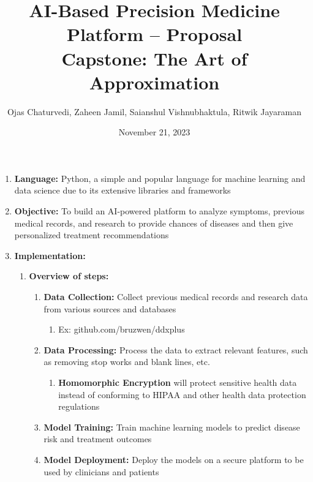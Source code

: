 \documentclass{article}
\title{AI-Based Precision Medicine Platform -- Proposal \\ \large Capstone: The Art of Approximation}
\author{Ojas Chaturvedi, Zaheen Jamil, Saianshul Vishnubhaktula, Ritwik Jayaraman}
\date{November 21, 2023}
\begin{document}
\maketitle


\begin{enumerate}
    \item \textbf{Language:} Python, a simple and popular language for machine learning and data science due to its extensive libraries and frameworks
    \item \textbf{Objective:} To build an AI-powered platform to analyze symptoms, previous medical records, and research to provide chances of diseases and then give personalized treatment recommendations
    \item \textbf{Implementation:}
        \begin{enumerate}
            \item \textbf{Overview of steps:}
                \begin{enumerate}
                    \item \textbf{Data Collection:} Collect previous medical records and research data from various sources and databases
                    \begin{enumerate}
                        \item Ex: github.com/bruzwen/ddxplus
                    \end{enumerate}
                    \item \textbf{Data Processing:} Process the data to extract relevant features, such as removing stop works and blank lines, etc.
                    \begin{enumerate}
                        \item \textbf{Homomorphic Encryption} will protect sensitive health data instead of conforming to HIPAA and other health data protection regulations
                    \end{enumerate}
                    \item \textbf{Model Training:} Train machine learning models to predict disease risk and treatment outcomes
                    \item \textbf{Model Deployment:} Deploy the models on a secure platform to be used by clinicians and patients
                \end{enumerate}

\end{enumerate}
\end{enumerate}
\end{document}
